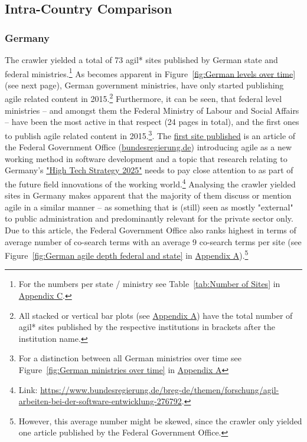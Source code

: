 \subsection{Intra-Country Comparison}\label{Intra-Country Comparison}
\subsubsection{Germany} 
The crawler yielded a total of 73 agil* sites published by German state and federal ministries.\footnote{For the numbers per state / ministry see Table~\ref{tab:Number of Sites} in \hyperref[Appendix C]{Appendix C}.} As becomes apparent in Figure~\ref{fig:German levels over time} (see next page), German government ministries, have only started publishing agile related content in 2015.\footnote{All stacked or vertical bar plots (see \hyperref[Appendix A]{Appendix A}) have the total number of agil* sites published by the respective institutions in brackets after the institution name.} Furthermore, it can be seen, that federal level ministries – and amongst them the Federal Ministry of Labour and Social Affairs – have been the most active in that respect (24 pages in total), and the first ones to publish agile related content in 2015.\footnote{For a distinction between all German ministries over time see Figure~\ref{fig:German ministries over time} in \hyperref[Appendix A]{Appendix A}}. The \href{https://www.bundesregierung.de/breg-de/themen/forschung/agil-arbeiten-bei-der-software-entwicklung-276792}{first site published} is an article of the Federal Government Office (\href{https://www.bundesregierung.de}{bundesregierung.de}) introducing agile as a new working method in software development and a topic that research relating to Germany's \href{https://www.hightech-strategie.de/de/hightech-strategie-2025-1726.html}{"High Tech Strategy 2025"} needs to pay close attention to as part of the future field innovations of the working world.\footnote{Link: \url{https://www.bundesregierung.de/breg-de/themen/forschung/agil-arbeiten-bei-der-software-entwicklung-276792}.} Analysing the crawler yielded sites in Germany makes apparent that the majority of them discuss or mention agile in a similar manner – as something that is (still) seen as mostly "external" to public administration and predominantly relevant for the private sector only. Due to this article, the Federal Government Office also ranks highest in terms of average number of co-search terms with an average 9 co-search terms per site (see Figure~\ref{fig:German agile depth federal and state} in \hyperref[Appendix A]{Appendix A}).\footnote{However, this average number might be skewed, since the crawler only yielded one article published by the Federal Government Office.}

